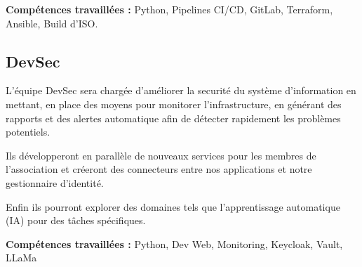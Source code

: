 \documentclass[12pt]{article}
\begin{document}
    \noindent \textbf{Compétences travaillées :}  Python, Pipelines CI/CD, GitLab, Terraform, Ansible, Build d'ISO.


    \subsection{DevSec}
    L'équipe DevSec sera chargée d'améliorer la securité du système d'information en mettant, en place des moyens pour monitorer l'infrastructure, en générant des rapports et des alertes automatique afin de détecter rapidement les problèmes potentiels.
    \bigskip

    \noindent Ils développeront en parallèle de nouveaux services pour les membres de l'association et créeront des connecteurs entre nos applications et notre gestionnaire d'identité. 
    \bigskip
    
    \noindent Enfin ils pourront explorer des domaines tels que l'apprentissage automatique (IA) pour des tâches spécifiques.
    \bigskip

    \noindent \textbf{Compétences travaillées :} Python, Dev Web, Monitoring, Keycloak, Vault, LLaMa
\end{document}

